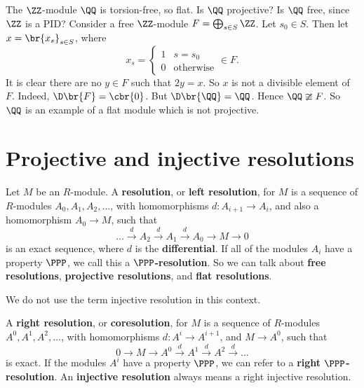 \begin{example*}
The $ \ZZ $-module $ \QQ $ is torsion-free, so flat. Is $ \QQ $ projective? Is $ \QQ $ free, since $ \ZZ $ is a PID? Consider a free $ \ZZ $-module $ F = \bigoplus_{s \in S} \ZZ $. Let $ s_0 \in S $. Then let $ x = \br{x_s}_{s \in S} $, where
$$ x_s =
\begin{cases}
1 & s = s_0 \\
0 & \text{otherwise}
\end{cases}
\in F. $$
It is clear there are no $ y \in F $ such that $ 2y = x $. So $ x $ is not a divisible element of $ F $. Indeed, $ \D\br{F} = \cbr{0} $. But $ \D\br{\QQ} = \QQ $. Hence $ \QQ \ncong F $. So $ \QQ $ is an example of a flat module which is not projective.
\end{example*}

\pagebreak

\section{Projective and injective resolutions}

\begin{definition}
Let $ M $ be an $ R $-module. A \textbf{resolution}, or \textbf{left resolution}, for $ M $ is a sequence of $ R $-modules $ A_0, A_1, A_2, \dots $, with homomorphisms $ d : A_{i + 1} \to A_i $, and also a homomorphism $ A_0 \to M $, such that
$$ \dots \xrightarrow{d} A_2 \xrightarrow{d} A_1 \xrightarrow{d} A_0 \to M \to 0 $$
is an exact sequence, where $ d $ is the \textbf{differential}. If all of the modules $ A_i $ have a property $ \PPP $, we call this a \textbf{$ \PPP $-resolution}. So we can talk about \textbf{free resolutions}, \textbf{projective resolutions}, and \textbf{flat resolutions}.
\end{definition}

We do not use the term injective resolution in this context.

\begin{definition}
A \textbf{right resolution}, or \textbf{coresolution}, for $ M $ is a sequence of $ R $-modules $ A^0, A^1, A^2, \dots $, with homomorphisms $ d : A^i \to A^{i + 1} $, and $ M \to A^0 $, such that
$$ 0 \to M \to A^0 \xrightarrow{d} A^1 \xrightarrow{d} A^2 \xrightarrow{d} \dots $$
is exact. If the modules $ A^i $ have a property $ \PPP $, we can refer to a \textbf{right $ \PPP $-resolution}. An \textbf{injective resolution} always means a right injective resolution.
\end{definition}

